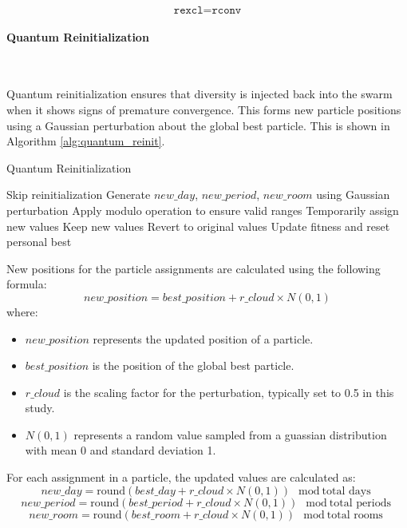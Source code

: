 \[
\texttt{rexcl} = \texttt{rconv}
\]

\paragraph{Quantum Reinitialization}\

Quantum reinitialization ensures that diversity is injected back into the swarm when it shows signs of premature convergence. This forms new particle positions using a Gaussian perturbation about the global best particle. This is shown in Algorithm \ref{alg:quantum_reinit}.

\begin{algorithm}[H]
    \caption{Quantum Reinitialization}
    \label{alg:quantum_reinit}
    \begin{algorithmic}[1]
                \State Skip reinitialization
            \Else
                    \State Generate $new\_day$, $new\_period$, $new\_room$ using Gaussian perturbation
                    \State Apply modulo operation to ensure valid ranges
                    \State Temporarily assign new values
                        \State Keep new values
                    \Else
                        \State Revert to original values
                    \EndIf
                \EndFor
                \State Update fitness and reset personal best
            \EndIf
        \EndFor
    \end{algorithmic}
\end{algorithm}

New positions for the particle assignments are calculated using the following formula:
\[
new\_position = best\_position + r\_cloud \times N(0, 1)
\]
where:
\begin{itemize}
    \item $new\_position$ represents the updated position of a particle.
    \item $best\_position$ is the position of the global best particle.
    \item $r\_cloud$ is the scaling factor for the perturbation, typically set to 0.5 in this study.
    \item $N(0, 1)$ represents a random value sampled from a guassian distribution with mean 0 and standard deviation 1.
\end{itemize}

For each assignment in a particle, the updated values are calculated as:
\[
new\_day = \text{round}(best\_day + r\_cloud \times N(0, 1)) \mod \text{total days}
\]
\[
new\_period = \text{round}(best\_period + r\_cloud \times N(0, 1)) \mod \text{total periods}
\]
\[
new\_room = \text{round}(best\_room + r\_cloud \times N(0, 1)) \mod \text{total rooms}
\]

